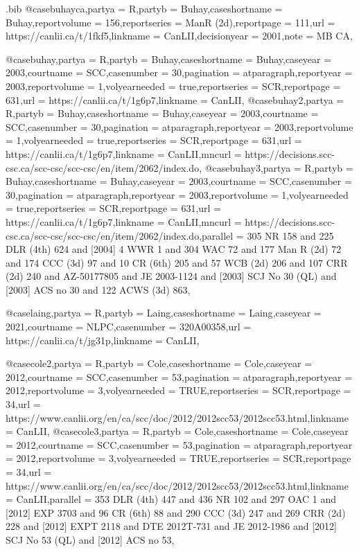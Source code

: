 \begin{filecontents*}[overwrite]{\jobname.bib}
@case{buhayca,partya =  {R},partyb =  {Buhay},caseshortname =  {Buhay},reportvolume =  {156},reportseries =  {ManR (2d)},reportpage =  {111},url =  {https://canlii.ca/t/1fkf5},linkname =  {CanLII},decisionyear =  {2001},note =  {MB CA},}

@case{buhay,partya =  {R},partyb =  {Buhay},caseshortname =  {Buhay},caseyear =  {2003},courtname =  {SCC},casenumber =  {30},pagination =  {atparagraph},reportyear =  {2003},reportvolume =  {1},volyearneeded =  {true},reportseries =  {SCR},reportpage =  {631},url =  {https://canlii.ca/t/1g6p7},linkname =  {CanLII},}
@case{buhay2,partya =  {R},partyb =  {Buhay},caseshortname =  {Buhay},caseyear =  {2003},courtname =  {SCC},casenumber =  {30},pagination =  {atparagraph},reportyear =  {2003},reportvolume =  {1},volyearneeded =  {true},reportseries =  {SCR},reportpage =  {631},url =  {https://canlii.ca/t/1g6p7},linkname =  {CanLII},mncurl =  {https://decisions.scc-csc.ca/scc-csc/scc-csc/en/item/2062/index.do},}
@case{buhay3,partya =  {R},partyb =  {Buhay},caseshortname =  {Buhay},caseyear =  {2003},courtname =  {SCC},casenumber =  {30},pagination =  {atparagraph},reportyear =  {2003},reportvolume =  {1},volyearneeded =  {true},reportseries =  {SCR},reportpage =  {631},url =  {https://canlii.ca/t/1g6p7},linkname =  {CanLII},mncurl =  {https://decisions.scc-csc.ca/scc-csc/scc-csc/en/item/2062/index.do},parallel =  {305 NR 158 and 225 DLR (4th) 624 and [2004] 4 WWR 1 and 304 WAC 72 and 177 Man R (2d) 72 and 174 CCC (3d) 97 and 10 CR (6th) 205 and 57 WCB (2d) 206 and 107 CRR (2d) 240 and AZ-50177805 and JE 2003-1124 and [2003] SCJ No 30 (QL) and [2003] ACS no 30 and 122 ACWS (3d) 863},}


@case{laing,partya =  {R},partyb =  {Laing},caseshortname =  {Laing},caseyear =  {2021},courtname =  {NLPC},casenumber =  {320A00358},url =  {https://canlii.ca/t/jg31p},linkname =  {CanLII},}



@case{cole2,partya =  {R},partyb =  {Cole},caseshortname =  {Cole},caseyear =  {2012},courtname =  {SCC},casenumber =  {53},pagination =  {atparagraph},reportyear =  {2012},reportvolume =  {3},volyearneeded =  {TRUE},reportseries =  {SCR},reportpage =  {34},url =  {https://www.canlii.org/en/ca/scc/doc/2012/2012scc53/2012scc53.html},linkname =  {CanLII},}
@case{cole3,partya =  {R},partyb =  {Cole},caseshortname =  {Cole},caseyear =  {2012},courtname =  {SCC},casenumber =  {53},pagination =  {atparagraph},reportyear =  {2012},reportvolume =  {3},volyearneeded =  {TRUE},reportseries =  {SCR},reportpage =  {34},url =  {https://www.canlii.org/en/ca/scc/doc/2012/2012scc53/2012scc53.html},linkname =  {CanLII},parallel =  {353 DLR (4th) 447 and 436 NR 102 and 297 OAC 1 and [2012] EXP 3703 and 96 CR (6th) 88 and 290 CCC (3d) 247 and 269 CRR (2d) 228 and [2012] EXPT 2118 and DTE 2012T-731 and JE 2012-1986 and [2012] SCJ No 53 (QL) and [2012] ACS no 53},}


\end{filecontents*}
